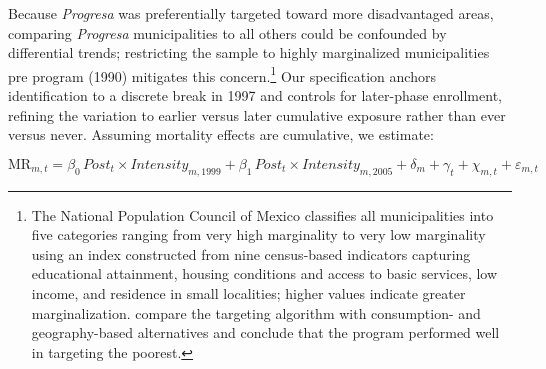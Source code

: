 \documentclass[12pt]{article}
\begin{document}
\p Because \textit{Progresa} was preferentially targeted toward more disadvantaged areas, comparing \textit{Progresa} municipalities to all others could be confounded by differential trends; restricting the sample to highly marginalized municipalities pre program (1990) mitigates this concern.\footnote{The National Population Council of Mexico \citep{CONAPO1993} classifies all municipalities into five categories ranging from very high marginality to very low marginality using an index constructed from nine census-based indicators capturing educational attainment, housing conditions and access to basic services, low income, and residence in small localities; higher values indicate greater marginalization. \cite{Skoufias2001WD} compare the targeting algorithm with consumption- and geography-based alternatives and conclude that the program performed well in targeting the poorest.} Our specification anchors identification to a discrete break in 1997 and controls for later-phase enrollment, refining the variation to earlier versus later cumulative exposure rather than ever versus never. Assuming mortality effects are cumulative, we estimate:

\begin{equation}\label{eq:did}
\text{MR}_{m,t}
= \beta_{0}\,\textit{Post}_{t}\times\textit{Intensity}_{m,1999}
+ \beta_{1}\,\textit{Post}_{t}\times\textit{Intensity}_{m,2005}
+ \delta_{m} + \gamma_{t} + \chi_{m,t} + \varepsilon_{m,t}
\end{equation}
\end{document}
